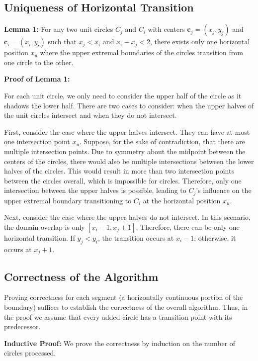 \documentclass[12pt]{article}
\begin{document}
\subsection*{Uniqueness of Horizontal Transition}

\textbf{Lemma 1:} For any two unit circles $C_j$ and $C_i$ with centers $\mathbf{c}_j = (x_j, y_j)$ and
$\mathbf{c}_i = (x_i, y_i)$ such that $x_j < x_i$ and $x_i - x_j < 2$, there exists only one horizontal
position $x_u$ where the upper extremal boundaries of the circles transition from one circle to the other.

\textbf{Proof of Lemma 1:}

For each unit circle, we only need to consider the upper half of the circle as it
shadows the lower half. There are two cases to consider: when the upper halves of the
unit circles intersect and when they do not intersect.

First, consider the case where the upper halves intersect. They can have at most
one intersection point $x_u$. Suppose, for the sake of contradiction, that there are multiple
intersection points. Due to symmetry about the midpoint between the centers of the
circles, there would also be multiple intersections between the lower halves of the circles.
This would result in more than two intersection points between the circles overall, which
is impossible for circles. Therefore, only one intersection between the upper halves is
possible, leading to $C_j$'s influence on the upper extremal boundary transitioning to $C_i$ at
the horizontal position $x_u$.

Next, consider the case where the upper halves do not intersect. In this scenario,
the domain overlap is only $[x_i - 1, x_j + 1]$. Therefore, there can be only one horizontal
transition. If $y_j < y_i$, the transition occurs at $x_i - 1$; otherwise, it occurs at $x_j + 1$.

\subsection*{Correctness of the Algorithm}

Proving correctness for each segment (a horizontally continuous portion of the boundary)
suffices to establish the correctness of the overall algorithm. Thus, in the proof we assume
that every added circle has a transition point with its predecessor.

\textbf{Inductive Proof:} We prove the correctness by induction on the number of circles
processed.
\end{document}
